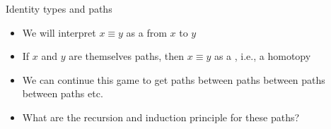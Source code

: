\documentclass[11pt]{beamer}
\newcommand{\red}[1]{{\color{red}{#1}}}
\begin{document}
\begin{frame}{Identity types and paths}
\begin{itemize}
\vfill\item We will interpret $x ≡ y$ as a \red{path} from $x$ to $y$
\vfill\item If $x$ and $y$ are themselves paths, then $x ≡ y$ as a \red{path
between paths}, i.e., a homotopy
\vfill\item We can continue this game to get paths between paths between
paths between paths etc.
\vfill\item What are the recursion and induction principle for these paths?
\end{itemize}

\begin{code}\>\<%
\\
\>\<%
\\
\> \AgdaSymbol{:} \AgdaSymbol{\{} \AgdaSymbol{:} \AgdaSymbol{\}} \AgdaSymbol{\{} \AgdaSymbol{:}   \AgdaSymbol{\}} \AgdaSymbol{\{}  \AgdaSymbol{:} \AgdaSymbol{\}}  \<[55]%
\>[55]\<%
\\
\>[0]\<[2]%
\>[2]\AgdaSymbol{(} \AgdaSymbol{:}   \AgdaSymbol{)}      \<%
\\
\> \AgdaSymbol{(} \AgdaSymbol{)}  \AgdaSymbol{=} \<%
\\
\>\<\end{code}

\end{frame}
\end{document}
